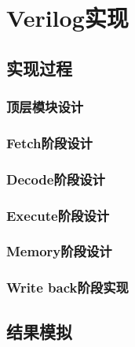 \documentclass[a4paper,12pt]{report}
\begin{document}
\chapter{Verilog实现}
\begin{spacing}{1.5}
	
\section{实现过程}

\subsection{顶层模块设计}


\subsection{Fetch阶段设计}

	
\subsection{Decode阶段设计}
	

\subsection{Execute阶段设计}
	

\subsection{Memory阶段设计}
	

\subsection{Write back阶段实现}


\section{结果模拟}
	
\end{spacing}

\end{document}
